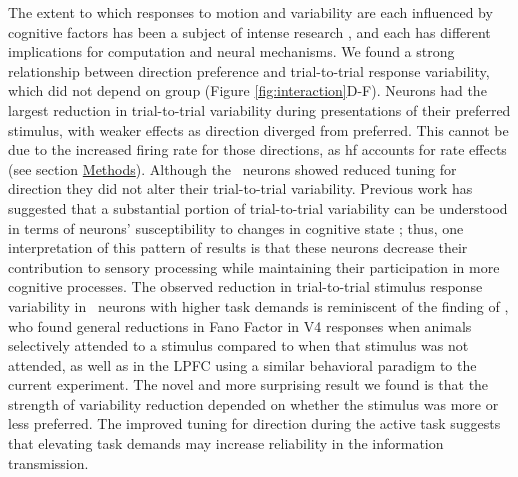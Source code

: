 The extent to which responses to motion and variability are each influenced by cognitive factors has been a subject of intense research \parencite{Renart2014,Gilbert2013}, and each has different implications for computation and neural mechanisms.   
We found a strong relationship between direction preference and trial-to-trial response variability, which did not depend on group (Figure \ref{fig:interaction}D-F). Neurons had the largest reduction in trial-to-trial variability during presentations of their preferred stimulus, with weaker effects as direction diverged from preferred. This cannot be due to the increased firing rate for those directions, as \gls{hf} accounts for rate effects (see section \hyperref[{sec:methods}]{Methods}). Although the \suppressed\ neurons showed reduced tuning for direction they did not alter their trial-to-trial variability. 
Previous work has suggested that a substantial portion of trial-to-trial variability can be understood in terms of neurons' susceptibility to changes in cognitive state \parencite{Ecker2016a,Denfield2018a}; thus, one interpretation of this pattern of results is that these neurons decrease their contribution to sensory processing while maintaining their participation in more cognitive processes.
The observed reduction in trial-to-trial stimulus response variability in \enhanced\ neurons with higher task demands is reminiscent of the finding of \textcite{Mitchell2007}, who found general reductions in Fano Factor in V4 responses when animals selectively attended to a stimulus compared to when that stimulus was not attended, as well as \textcite{Hussar2010} in the LPFC using a similar behavioral paradigm to the current experiment.
The novel and more surprising result we found is that the strength of variability reduction depended on whether the stimulus was more or less preferred. The improved tuning for direction during the active task suggests that elevating task demands may increase reliability in the information transmission.


